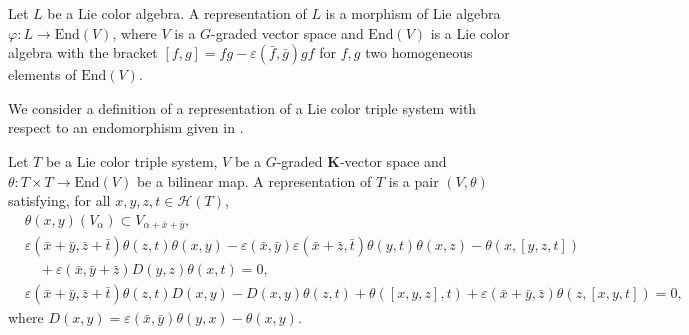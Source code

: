 \documentclass[11pt, twoside]{article}
\begin{document}

\begin{defi}[\cite{F01}]
    Let $L$ be a Lie color algebra. A representation of $L$ is a morphism of Lie algebra $\varphi:L\to \mathrm{End}(V) $, where $V$ is a $G$-graded vector space and $\mathrm{End}(V)$ is a Lie color algebra with the bracket $[f,g]=fg-\varepsilon(\bar{f},\bar{g})gf $ for $f,g$ two homogeneous elements of $\mathrm{End}(V) $. 
\end{defi}

We consider a definition of a representation of a Lie color triple system with respect to an endomorphism given in \cite[Definition $2.4 $]{LM22}.
\begin{defi}\label{d5.2}
    Let $T$ be a Lie color triple system, $V$ be a $G$-graded $\mathbf{K}$-vector space and $\theta:T\times T\to \mathrm{End}(V) $ be a bilinear map. A representation of $T$ is a pair $(V,\theta)$ satisfying, for all $x,y,z,t\in \mathcal{H}(T)$, 
           \begin{align}
          & \theta(x,y)(V_\alpha)\subset V_{\alpha+\bar{x}+\bar{y}} ,\label{rep1}\\
            &   \varepsilon(\bar{x}+\bar{y},\bar{z}+\bar{t})\theta(z,t)\theta(x,y)-\varepsilon(\bar{x},\bar{y})\varepsilon(\bar{x}+\bar{z},\bar{t})\theta(y,t)\theta(x,z)-\theta(x,[y,z,t])\nonumber\\& \quad + \varepsilon(\bar{x},\bar{y}+\bar{z})D(y,z)\theta(x,t)=0, %
               \label{rep2} \\ &
          \varepsilon(\bar{x}+\bar{y},\bar{z}+\bar{t})\theta(z,t)D(x,y)-D(x,y)\theta(z,t)+\theta([x,y,z],t)+ \varepsilon(\bar{x}+\bar{y},\bar{z})\theta(z,[x,y,t])=0 ,\label{rep3}
          \end{align} where $D(x,y)=\varepsilon(\bar{x},\bar{y})\theta(y,x)-\theta(x,y) $.
\end{defi}
\end{document}
